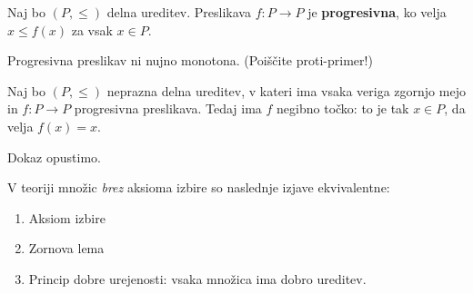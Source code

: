 \begin{definicija}
  Naj bo $(P, \leq)$ delna ureditev. Preslikava $f : P \to P$ je \textbf{progresivna}, ko
  velja $x \leq f(x)$ za vsak $x \in P$.
\end{definicija}

\begin{opomba}
  Progresivna preslikav ni nujno monotona. (Poiščite proti-primer!)
\end{opomba}

\begin{izrek}
  Naj bo $(P, {\leq})$ neprazna delna ureditev, v kateri ima vsaka veriga zgornjo mejo in $f : P \to P$ progresivna
  preslikava. Tedaj ima $f$ negibno točko: to je tak $x \in P$, da velja $f(x) = x$.
\end{izrek}

\begin{dokaz}
  Dokaz opustimo.
\end{dokaz}

\begin{izrek}
  V teoriji množic \emph{brez} aksioma izbire so naslednje izjave ekvivalentne:
  \begin{enumerate}
  \item Aksiom izbire
  \item Zornova lema
  \item Princip dobre urejenosti: vsaka množica ima dobro ureditev.
  \end{enumerate}
\end{izrek}

